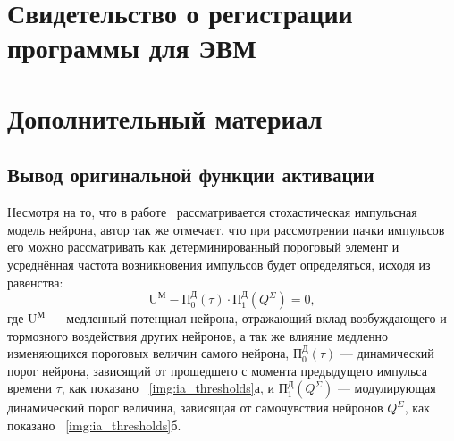 \appendix
\setlength{\midchapskip}{20pt}
\renewcommand*{\afterchapternum}{\par\nobreak\vskip \midchapskip}
\renewcommand\thechapter{\Asbuk{chapter}} %


\chapter{Свидетельство о регистрации программы для ЭВМ} \label{appendix:programm_registration}
\begin{figure}[ht]
\end{figure}


\chapter{Дополнительный материал} \label{appendix:math}

\section{Вывод оригинальной функции активации}  \label{appendix:math:activation_function}

Несмотря на то, что в работе~\cite{EmelyanovYaroslavsky1990} рассматривается стохастическая импульсная модель нейрона, автор так же отмечает, что при рассмотрении \socalled пачки импульсов его можно рассматривать как детерминированный пороговый элемент и усреднённая частота возникновения импульсов будет определяться, исходя из равенства: $$\text{U}^\text{М} - \text{П}_{0}^\text{Д}(\tau) \cdot \text{П}_{1}^\text{Д}(Q^\Sigma) = 0 ,$$ где $\text{U}^\text{М}$ --- медленный потенциал нейрона, отражающий вклад возбуждающего и тормозного воздействия других нейронов, а так же влияние медленно изменяющихся пороговых величин самого нейрона, $\text{П}_{0}^\text{Д}(\tau)$ --- динамический порог нейрона, зависящий от прошедшего с момента предыдущего импульса времени $\tau$, как показано \onfigure~\ref{img:ia_thresholds}а, и $\text{П}_{1}^\text{Д}(Q^\Sigma)$ --- модулирующая динамический порог величина, зависящая от \socalled самочувствия нейронов $Q^\Sigma$, как показано \onfigure~\ref{img:ia_thresholds}б.

